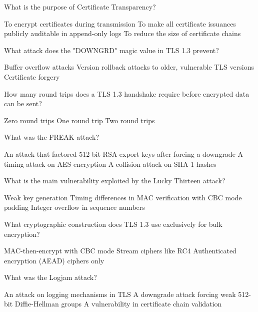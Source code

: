 \documentclass[10pt,a4paper,american]{exam}
\begin{document}
\begin{questions}
	\question What is the purpose of Certificate Transparency?
	\begin{randomizechoices}
		\choice To encrypt certificates during transmission
		\CorrectChoice To make all certificate issuances publicly auditable in append-only logs
		\choice To reduce the size of certificate chains
	\end{randomizechoices}

	\question What attack does the "DOWNGRD" magic value in TLS 1.3 prevent?
	\begin{randomizechoices}
		\choice Buffer overflow attacks
		\CorrectChoice Version rollback attacks to older, vulnerable TLS versions
		\choice Certificate forgery
	\end{randomizechoices}

	\question How many round trips does a TLS 1.3 handshake require before encrypted data can be sent?
	\begin{randomizechoices}
		\choice Zero round trips
		\CorrectChoice One round trip
		\choice Two round trips
	\end{randomizechoices}

	\question What was the FREAK attack?
	\begin{randomizechoices}
		\CorrectChoice An attack that factored 512-bit RSA export keys after forcing a downgrade
		\choice A timing attack on AES encryption
		\choice A collision attack on SHA-1 hashes
	\end{randomizechoices}

	\question What is the main vulnerability exploited by the Lucky Thirteen attack?
	\begin{randomizechoices}
		\choice Weak key generation
		\CorrectChoice Timing differences in MAC verification with CBC mode padding
		\choice Integer overflow in sequence numbers
	\end{randomizechoices}

	\question What cryptographic construction does TLS 1.3 use exclusively for bulk encryption?
	\begin{randomizechoices}
		\choice MAC-then-encrypt with CBC mode
		\choice Stream ciphers like RC4
		\CorrectChoice Authenticated encryption (AEAD) ciphers only
	\end{randomizechoices}

	\question What was the Logjam attack?
	\begin{randomizechoices}
		\choice An attack on logging mechanisms in TLS
		\CorrectChoice A downgrade attack forcing weak 512-bit Diffie-Hellman groups
		\choice A vulnerability in certificate chain validation
	\end{randomizechoices}


\end{questions}
\end{document}
